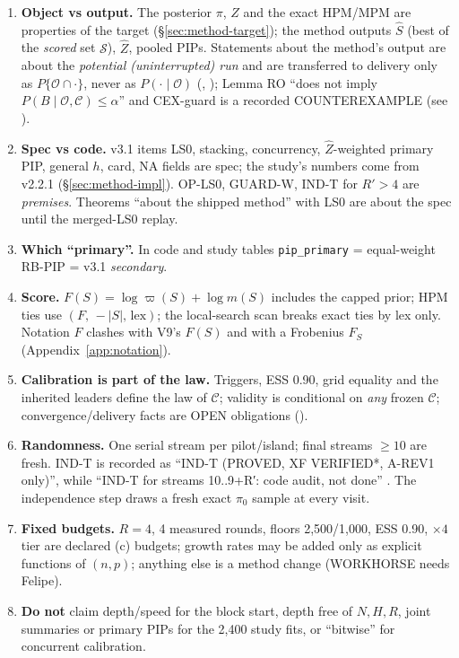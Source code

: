 \begin{agentnote}
\begin{enumerate}[leftmargin=*]
\item \textbf{Object vs output.} The posterior $\pi$, $Z$ and the exact HPM/MPM are properties of the target (\S\ref{sec:method-target});
  the method outputs $\hat S$ (best of the \emph{scored} set $\mathcal S$), $\hat Z$, pooled PIPs. Statements about the method's
  output are about the \emph{potential (uninterrupted) run} and are transferred to delivery only as $P\{\mathcal O\cap\cdot\}$, never as
  $P(\cdot\mid\mathcal O)$ (, ); Lemma RO ``does not imply $P(B\mid\mathcal O,\mathcal C)\le\alpha$'' and CEX-guard is a
  recorded COUNTEREXAMPLE  (see ).
\item \textbf{Spec vs code.} v3.1 items LS0, stacking, concurrency, $\hat Z$-weighted primary PIP, general $h$, card, NA fields are spec;
  the study's numbers come from v2.2.1 (\S\ref{sec:method-impl}). OP-LS0, GUARD-W, IND-T for $R'>4$ are \emph{premises}. Theorems
  ``about the shipped method'' with LS0 are about the spec until the merged-LS0 replay.
\item \textbf{Which ``primary''.} In code and study tables \texttt{pip\_primary} = equal-weight RB-PIP = v3.1 \emph{secondary}.
\item \textbf{Score.} $F(S)=\log\varpi(S)+\log m(S)$ includes the capped prior; HPM ties use $(F,\,-|S|,\,\text{lex})$; the local-search
  scan breaks exact ties by lex only. Notation $F$ clashes with V9's $F(S)$ and with a Frobenius $F_S$ (Appendix~\ref{app:notation}).
\item \textbf{Calibration is part of the law.} Triggers, ESS 0.90, grid equality and the inherited leaders define the law of $\mathcal C$;
  validity is conditional on \emph{any} frozen $\mathcal C$; convergence/delivery facts are OPEN obligations ().
\item \textbf{Randomness.} One serial stream per pilot/island; final streams $\ge10$ are fresh. IND-T is recorded as ``IND-T (PROVED,
  XF VERIFIED*, A-REV1 only)'', while ``IND-T for streams 10..9+R′: code audit, not done''
   .
  The independence step draws a fresh exact $\pi_0$ sample at every visit.
\item \textbf{Fixed budgets.} $R=4$, 4 measured rounds, floors 2,500/1,000, ESS 0.90, $\times4$ tier are declared (c) budgets; growth
  rates may be added only as explicit functions of $(n,p)$; anything else is a method change (WORKHORSE needs Felipe).
\item \textbf{Do not} claim depth/speed for the block start, depth free of $N,H,R$, joint summaries or primary PIPs for the 2,400
  study fits, or ``bitwise'' for concurrent calibration.
\end{enumerate}
\end{agentnote}
